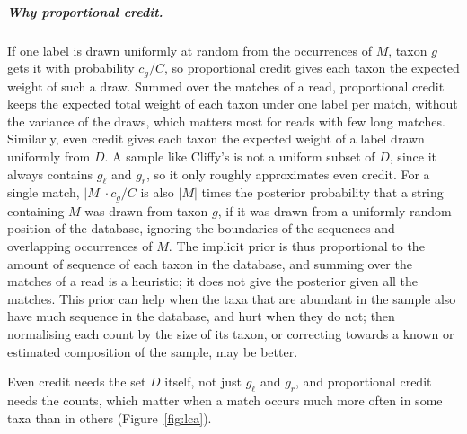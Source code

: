 \subparagraph*{Why proportional credit.}
If one label is drawn uniformly at random from the occurrences of $M$, taxon $g$ gets it with probability $c_g / C$, so proportional credit gives each taxon the expected weight of such a draw.
Summed over the matches of a read, proportional credit keeps the expected total weight of each taxon under one label per match, without the variance of the draws, which matters most for reads with few long matches.
Similarly, even credit gives each taxon the expected weight of a label drawn uniformly from $D$.
A sample like Cliffy's is not a uniform subset of $D$, since it always contains $g_\ell$ and $g_r$, so it only roughly approximates even credit.
For a single match, $|M| \cdot c_g / C$ is also $|M|$ times the posterior probability that a string containing $M$ was drawn from taxon $g$, if it was drawn from a uniformly random position of the database, ignoring the boundaries of the sequences and overlapping occurrences of $M$.
The implicit prior is thus proportional to the amount of sequence of each taxon in the database, and summing over the matches of a read is a heuristic; it does not give the posterior given all the matches.
This prior can help when the taxa that are abundant in the sample also have much sequence in the database, and hurt when they do not; then normalising each count by the size of its taxon, or correcting towards a known or estimated composition of the sample, may be better.

Even credit needs the set $D$ itself, not just $g_\ell$ and $g_r$, and proportional credit needs the counts, which matter when a match occurs much more often in some taxa than in others (Figure~\ref{fig:lca}).

